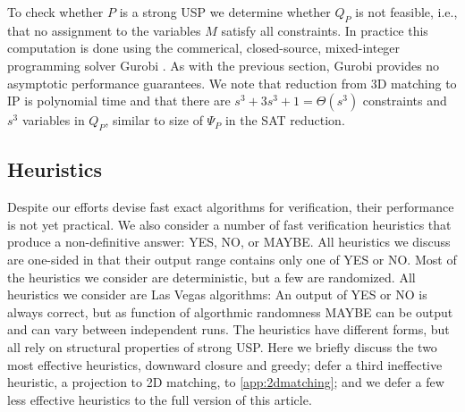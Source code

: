 \documentclass[11pt]{article}
\begin{document}
To check whether $P$ is a strong USP we determine whether $Q_P$ is not feasible,
i.e., that no
assignment to the variables $M$ satisfy all constraints.  In
practice this computation is done using the commerical, closed-source, mixed-integer
programming solver Gurobi \cite{gurobi}.
As with the previous section, Gurobi provides no asymptotic performance
guarantees.  We note that reduction from
3D matching to IP is polynomial time and that there are $s^3 + 3s^3 + 1 = \Theta(s^3)$
constraints and $s^3$ variables in $Q_P$, similar to size of $\Psi_P$ in the SAT reduction.
 
\label{subsec:mip}




\subsection{Heuristics}
\label{sec:heuristic}

Despite our efforts devise fast exact algorithms for verification,
their performance is not yet practical.  We also consider a number of
fast verification heuristics that produce a non-definitive answer:
YES, NO, or MAYBE.  All heuristics we discuss are one-sided
in that their output range contains only one of YES or NO.
Most of the heuristics we consider are deterministic, but a few are
randomized.  All heuristics we consider are Las Vegas algorithms: An
output of YES or NO is always correct, but as function of algorthmic
randomness MAYBE can be output and can vary between independent runs.
The heuristics have different forms, but all rely on structural
properties of strong USP.  Here we briefly discuss the two most
effective heuristics, downward closure and greedy; defer a third
ineffective heuristic, a projection to 2D matching, to
\autoref{app:2dmatching}; and we defer a few less effective heuristics to
the full version of this article.
\end{document}
